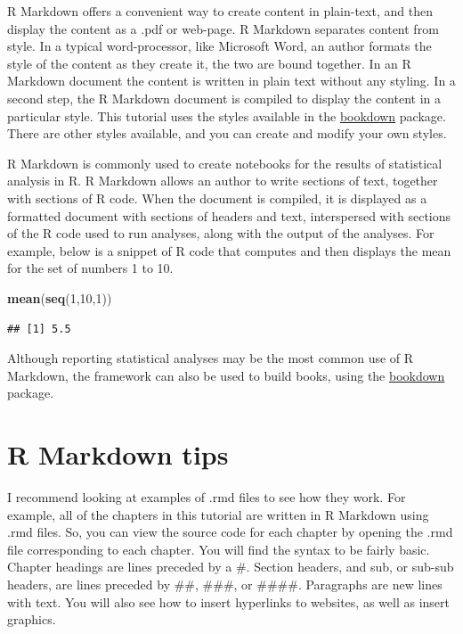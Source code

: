 \documentclass[]{book}
\newenvironment{Shaded}{\begin{snugshade}}{\end{snugshade}}
\newcommand{\KeywordTok}[1]{\textcolor[rgb]{0.13,0.29,0.53}{\textbf{{#1}}}}
\newcommand{\DecValTok}[1]{\textcolor[rgb]{0.00,0.00,0.81}{{#1}}}
\newcommand{\NormalTok}[1]{{#1}}
\theoremstyle{definition}
\theoremstyle{definition}
\theoremstyle{definition}
\theoremstyle{remark}
\begin{document}
R Markdown offers a convenient way to create content in plain-text, and
then display the content as a .pdf or web-page. R Markdown separates
content from style. In a typical word-processor, like Microsoft Word, an
author formats the style of the content as they create it, the two are
bound together. In an R Markdown document the content is written in
plain text without any styling. In a second step, the R Markdown
document is compiled to display the content in a particular style. This
tutorial uses the styles available in the
\href{https://bookdown.org/yihui/bookdown/}{bookdown} package. There are
other styles available, and you can create and modify your own styles.

R Markdown is commonly used to create notebooks for the results of
statistical analysis in R. R Markdown allows an author to write sections
of text, together with sections of R code. When the document is
compiled, it is displayed as a formatted document with sections of
headers and text, interspersed with sections of the R code used to run
analyses, along with the output of the analyses. For example, below is a
snippet of R code that computes and then displays the mean for the set
of numbers 1 to 10.

\begin{Shaded}
\begin{Highlighting}[]
\KeywordTok{mean}\NormalTok{(}\KeywordTok{seq}\NormalTok{(}\DecValTok{1}\NormalTok{,}\DecValTok{10}\NormalTok{,}\DecValTok{1}\NormalTok{))}
\end{Highlighting}
\end{Shaded}

\begin{verbatim}
## [1] 5.5
\end{verbatim}

Although reporting statistical analyses may be the most common use of R
Markdown, the framework can also be used to build books, using the
\href{https://bookdown.org/yihui/bookdown/}{bookdown} package.

\section{R Markdown tips}\label{r-markdown-tips}

I recommend looking at examples of .rmd files to see how they work. For
example, all of the chapters in this tutorial are written in R Markdown
using .rmd files. So, you can view the source code for each chapter by
opening the .rmd file corresponding to each chapter. You will find the
syntax to be fairly basic. Chapter headings are lines preceded by a \#.
Section headers, and sub, or sub-sub headers, are lines preceded by
\#\#, \#\#\#, or \#\#\#\#. Paragraphs are new lines with text. You will
also see how to insert hyperlinks to websites, as well as insert
graphics.
\end{document}
